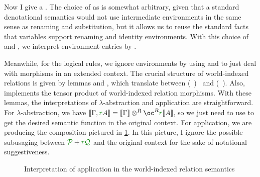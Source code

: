 Now I give a .
The choice of \AgdaBound{$\V$} as
\AgdaRecord{\AgdaUnderscore{}$\sqni$\AgdaUnderscore{}} is somewhat arbitrary,
given that a standard denotational semantics would not use intermediate
environments in the same sense as renaming and substitution, but it allows us to
reuse the standard facts that variables support renaming and identity
environments.
With this choice of \AgdaBound{$\V$} and \AgdaBound{$\C$}, we interpret
environment entries by .

Meanwhile, for the logical rules, we ignore environments by using
 and  to just deal with morphisms in
an extended context.
The crucial structure of world-indexed relations is given by lemmas
 and , which translate between
\mbox{\AgdaSpace{}\AgdaSymbol(\AgdaSpace{}%
\AgdaSpace{}\AgdaSymbol)%
\AgdaSpace{}} and
\mbox{\AgdaSpace{}\AgdaSpace{}\AgdaSymbol(%
\AgdaSpace{}\AgdaSpace{}%
\AgdaSymbol)}.
Also,  implements the tensor
product of world-indexed relation morphisms.
With these lemmas, the interpretations of $\lambda$-abstraction and application
are straightforward.
For $\lambda$-abstraction, we have
\mbox{$\sem{\Gamma, \gr rA} = \sem\Gamma \otimes^R \oc^R\gr r\sem{A}$},
so we just need to use  to get the desired semantic
function in the original context.
For application, we are producing the composition pictured in
\cref{fig:Wrel-app}.
In this picture, I ignore the possible subusaging between $\grP + \gr r\grQ$ and
the original context for the sake of notational suggestiveness.


\begin{figure}
  \centering
  \caption{Interpretation of application in the world-indexed relation
    semantics}
  \label{fig:Wrel-app}
\end{figure}

